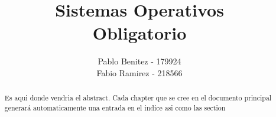 
\title{Sistemas Operativos\\Obligatorio}
\author{Pablo Benitez - 179924\\Fabio Ramirez - 218566}
\usepackage{hyperref}
\usepackage{float}



\nocite{*}



\maketitle


\begin{abstract}
    Es aqui donde vendria el abstract. Cada chapter que se cree en el documento principal generará automaticamente una entrada en el indice asi como las section
    
\end{abstract}

\tableofcontents



